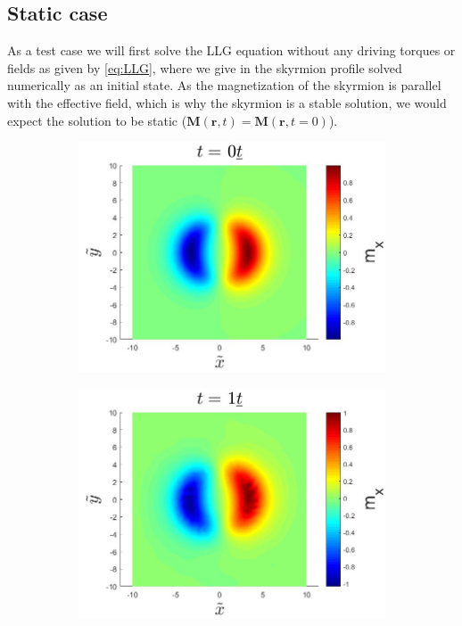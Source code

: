 \subsection{Static case}
As a test case we will first solve the LLG equation without any driving torques or fields as given by \eqref{eq:LLG}, where we give in the skyrmion profile solved numerically as an initial state. As the magnetization of the skyrmion is parallel with the effective field, which is why the skyrmion is a stable solution, we would expect the solution to be static ($\mathbold{M}(\mathbold{r},t) = \mathbold{M}(\mathbold{r},t=0)$).
\begin{figure}[h!]
\centering
\begin{subfigure}{.3\textwidth}
  \centering
  \includegraphics[width=\linewidth]{Figures/StaticSkyrmionMxT0.jpg}
  \caption{}
  \label{fig:StaticSkyrmionMxT0}
\end{subfigure}
\begin{subfigure}{.3\textwidth}
  \centering
  \includegraphics[width=\linewidth]{Figures/StaticSkyrmionMxT1.jpg}

\end{subfigure}
\end{figure}
